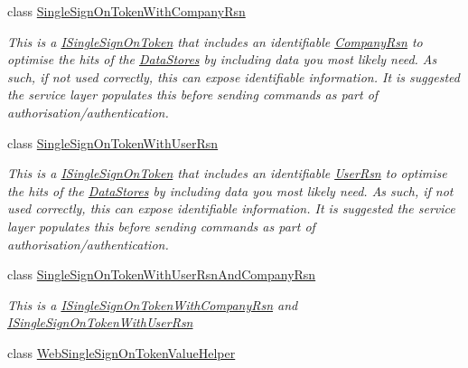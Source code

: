 \begin{DoxyCompactItemize}
class \hyperlink{classCqrs_1_1Authentication_1_1SingleSignOnTokenWithCompanyRsn}{Single\+Sign\+On\+Token\+With\+Company\+Rsn}
\begin{DoxyCompactList}\small\item\em This is a \hyperlink{interfaceCqrs_1_1Authentication_1_1ISingleSignOnToken}{I\+Single\+Sign\+On\+Token} that includes an identifiable \hyperlink{classCqrs_1_1Authentication_1_1SingleSignOnTokenWithCompanyRsn_abb327084c1ff87de84c92008b4437675_abb327084c1ff87de84c92008b4437675}{Company\+Rsn} to optimise the hits of the \hyperlink{}{Data\+Stores} by including data you most likely need. As such, if not used correctly, this can expose identifiable information. It is suggested the service layer populates this before sending commands as part of authorisation/authentication. \end{DoxyCompactList}\item 
class \hyperlink{classCqrs_1_1Authentication_1_1SingleSignOnTokenWithUserRsn}{Single\+Sign\+On\+Token\+With\+User\+Rsn}
\begin{DoxyCompactList}\small\item\em This is a \hyperlink{interfaceCqrs_1_1Authentication_1_1ISingleSignOnToken}{I\+Single\+Sign\+On\+Token} that includes an identifiable \hyperlink{classCqrs_1_1Authentication_1_1SingleSignOnTokenWithUserRsn_a47d20dd286cf61cc23028e75cddcca79_a47d20dd286cf61cc23028e75cddcca79}{User\+Rsn} to optimise the hits of the \hyperlink{}{Data\+Stores} by including data you most likely need. As such, if not used correctly, this can expose identifiable information. It is suggested the service layer populates this before sending commands as part of authorisation/authentication. \end{DoxyCompactList}\item 
class \hyperlink{classCqrs_1_1Authentication_1_1SingleSignOnTokenWithUserRsnAndCompanyRsn}{Single\+Sign\+On\+Token\+With\+User\+Rsn\+And\+Company\+Rsn}
\begin{DoxyCompactList}\small\item\em This is a \hyperlink{interfaceCqrs_1_1Authentication_1_1ISingleSignOnTokenWithCompanyRsn}{I\+Single\+Sign\+On\+Token\+With\+Company\+Rsn} and \hyperlink{interfaceCqrs_1_1Authentication_1_1ISingleSignOnTokenWithUserRsn}{I\+Single\+Sign\+On\+Token\+With\+User\+Rsn} \end{DoxyCompactList}\item 
class \hyperlink{classCqrs_1_1Authentication_1_1WebSingleSignOnTokenValueHelper}{Web\+Single\+Sign\+On\+Token\+Value\+Helper}
\end{DoxyCompactItemize}
